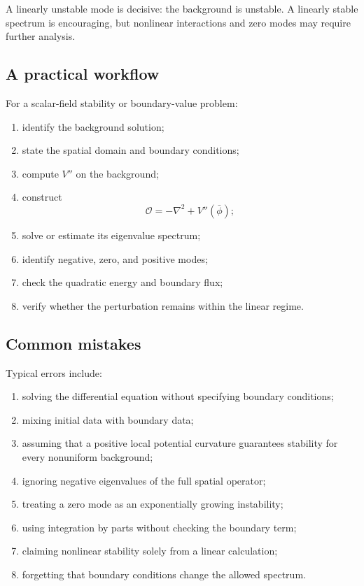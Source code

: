 A linearly unstable mode is decisive: the background is unstable. A linearly stable spectrum is encouraging, but nonlinear interactions and zero modes may require further analysis.

\subsection{A practical workflow}

For a scalar-field stability or boundary-value problem:

\begin{enumerate}
    \item identify the background solution;
    \item state the spatial domain and boundary conditions;
    \item compute \(V''\) on the background;
    \item construct
    \[
    \mathcal{O}=-\nabla^{2}+V''(\bar\phi);
    \]
    \item solve or estimate its eigenvalue spectrum;
    \item identify negative, zero, and positive modes;
    \item check the quadratic energy and boundary flux;
    \item verify whether the perturbation remains within the linear regime.
\end{enumerate}

\subsection{Common mistakes}

Typical errors include:

\begin{enumerate}
    \item solving the differential equation without specifying boundary conditions;
    \item mixing initial data with boundary data;
    \item assuming that a positive local potential curvature guarantees stability for every nonuniform background;
    \item ignoring negative eigenvalues of the full spatial operator;
    \item treating a zero mode as an exponentially growing instability;
    \item using integration by parts without checking the boundary term;
    \item claiming nonlinear stability solely from a linear calculation;
    \item forgetting that boundary conditions change the allowed spectrum.
\end{enumerate}

